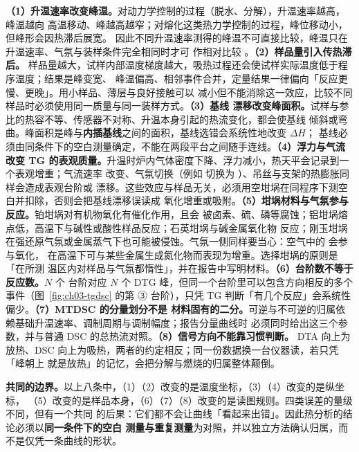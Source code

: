 \begin{pitfall}
\textbf{（1）升温速率改变峰温。}对动力学控制的过程（脱水、分解），升温速率越高，峰温越向
高温移动、峰越高越窄；对熔化这类热力学控制的过程，峰位移动小，但峰形会因热滞后展宽。
因此不同升温速率测得的峰温不可直接比较，峰温只在升温速率、气氛与装样条件完全相同时才可
作相对比较 。\textbf{（2）样品量引入传热滞后。}
样品量越大，试样内部温度梯度越大，吸热过程还会使试样实际温度低于程序温度；结果是峰变宽、
峰温偏高、相邻事件合并，定量结果一律偏向「反应更慢、更晚」。用小样品、薄层与良好接触可以
减小但不能消除这一效应，比较不同样品时必须使用同一质量与同一装样方式。\textbf{（3）基线
漂移改变峰面积。}试样与参比的热容不等、传感器不对称、升温本身引起的热流变化，都会使基线
倾斜或弯曲。峰面积是峰与\textbf{内插基线}之间的面积，基线选错会系统性地改变 $\Delta H$；
基线必须由同条件下的空白测量确定，不能在两段平台之间随手连线。\textbf{（4）浮力与气流改变
TG 的表观质量。}升温时炉内气体密度下降、浮力减小，热天平会记录到一个表观增重；气流速率
改变、气氛切换（例如  切换为 ）、吊丝与支架的热膨胀同样会造成表观台阶或
漂移。这些效应与样品无关，必须用空坩埚在同程序下测空白并扣除，否则会把基线漂移误读成
氧化增重或吸附。\textbf{（5）坩埚材料与气氛参与反应。}铂坩埚对有机物氧化有催化作用，且会
被卤素、硫、磷等腐蚀；铝坩埚熔点低，高温下与碱性或酸性样品反应；石英坩埚与碱金属氧化物
反应；刚玉坩埚在强还原气氛或金属蒸气下也可能被侵蚀。气氛一侧同样要当心：空气中的 
会参与氧化， 在高温下可与某些金属生成氮化物而表现为增重。选择坩埚的原则是「在所测
温区内对样品与气氛都惰性」，并在报告中写明材料。\textbf{（6）台阶数不等于反应数。}$N$ 个
台阶对应 $N$ 个 DTG 峰，但同一个台阶里可以包含方向相反的多个事件（图~\ref{fig:ch03-tgdsc}
的第 ③ 台阶），只凭 TG 判断「有几个反应」会系统性偏少。\textbf{（7）MTDSC 的分量划分不是
材料固有的二分。}可逆与不可逆的归属依赖基础升温速率、调制周期与调制幅度；报告分量曲线时
必须同时给出这三个参数，并与普通 DSC 的总热流对照。\textbf{（8）信号方向不能靠习惯判断。}
DTA 向上为放热、DSC 向上为吸热，两者的约定相反；同一份数据换一台仪器读，若只凭「峰朝上
就是放热」的记忆，会把分解与燃烧的归属整体颠倒。
\end{pitfall}

\textbf{共同的边界。}以上八条中，（1）（2）改变的是温度坐标，（3）（4）改变的是纵坐标，
（5）改变的是样品本身，（6）（7）（8）改变的是读图规则。四类误差的量级不同，但有一个共同
的后果：它们都不会让曲线「看起来出错」。因此热分析的结论必须以\textbf{同一条件下的空白
测量与重复测量}为对照，并以独立方法确认归属，而不是仅凭一条曲线的形状。

